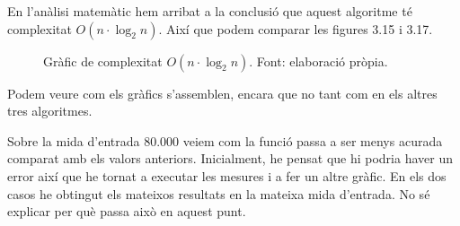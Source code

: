 En l'anàlisi matemàtic hem arribat a la conclusió que aquest algoritme té complexitat $O(n \cdot \log_2{n})$. Així que podem comparar les figures 3.15 i 3.17.
\begin{figure}[H]
    \centering
{}
    \caption[Gràfic de complexitat $O(n \cdot \log_2{n})$.]{Gràfic de complexitat $O(n \cdot \log_2{n})$. Font: elaboració pròpia.}
    \label{fig:my_label}
\end{figure}

Podem veure com els gràfics s'assemblen, encara que no tant com en els altres tres algoritmes. 

Sobre la mida d'entrada 80.000 veiem com la funció passa a ser menys acurada comparat amb els valors anteriors. Inicialment, he pensat que hi podria haver un error així que he tornat a executar les mesures i a fer un altre gràfic. En els dos casos he obtingut els mateixos resultats en la mateixa mida d'entrada. No sé explicar per què passa això en aquest punt.